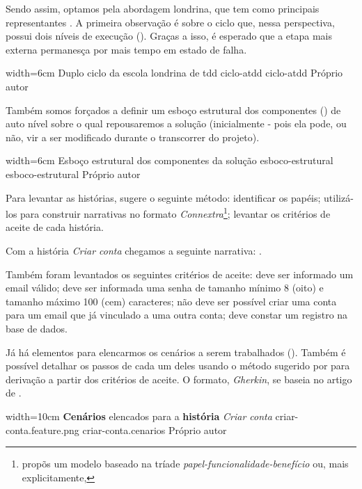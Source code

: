   Sendo assim, optamos pela abordagem londrina, que tem como principais representantes . A primeira observação é sobre o ciclo que, nessa perspectiva, possui dois níveis de execução (). Graças a isso, é esperado que a etapa mais externa permanesça por mais tempo em estado de falha.

  \imagem
    {width=6cm}
    {Duplo ciclo da escola londrina de tdd}
    {ciclo-atdd}
    {ciclo-atdd}
    {Próprio autor\footnotemark}

  Também somos forçados a definir um esboço estrutural dos componentes () de auto nível sobre o qual repousaremos a solução (inicialmente - pois ela pode, ou não, vir a ser modificado durante o transcorrer do projeto).

  \imagem
    {width=6cm}
    {Esboço estrutural dos componentes da solução}
    {esboco-estrutural}
    {esboco-estrutural}
    {Próprio autor}

  Para levantar as histórias,  sugere o seguinte método: identificar os papéis; utilizá-los para construir narrativas no formato \emph{Connextra}\footnote{ propõs um modelo baseado na tríade \emph{papel-funcionalidade-benefício} ou, mais explicitamente, }; levantar os critérios de aceite de cada história.

  Com a história \emph{Criar conta} chegamos a seguinte narrativa: .

  Também foram levantados os seguintes critérios de aceite: deve ser informado um email válido; deve ser informada uma senha de tamanho mínimo 8 (oito) e tamanho máximo 100 (cem) caracteres; não deve ser possível criar uma conta para um email que já vinculado a uma outra conta; deve constar um registro na base de dados.

  Já há elementos para elencarmos os cenários a serem trabalhados (). Também é possível detalhar os passos de cada um deles usando o método sugerido por  para derivação a partir dos critérios de aceite. O formato, \emph{Gherkin}, se baseia no artigo de .

  \imagem
    {width=10cm}
    {\textbf{Cenários} elencados para a \textbf{história} \emph{Criar conta}}
    {criar-conta.feature.png}
    {criar-conta.cenarios}
    {Próprio autor}

